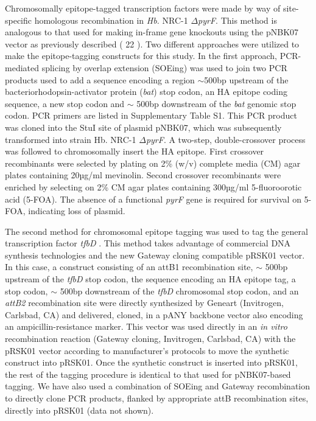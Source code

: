Chromosomally epitope-tagged transcription factors were made by way of site-specific homologous recombination in {\em Hb.} NRC-1 $\Delta${\em pyrF}. This method is analogous to that used for making in-frame gene knockouts using the pNBK07 vector as previously described ( 22 ). Two different approaches were utilized to make the epitope-tagging constructs for this study. In the first approach, PCR-mediated splicing by overlap extension (SOEing) \cite{horton1989engineering} was used to join two PCR products used to add a sequence encoding a region $\sim$500bp upstream of the bacteriorhodopsin-activator protein ({\em bat}) stop codon, an HA epitope coding sequence, a new stop codon and $\sim$ 500bp downstream of the {\em bat} genomic stop codon. PCR primers are listed in Supplementary Table S1. This PCR product was cloned into the StuI site of plasmid pNBK07, which was subsequently transformed into strain Hb. NRC-1 $\Delta${\em pyrF}. A two-step, double-crossover process was followed to chromosomally insert the HA epitope. First crossover recombinants were selected by plating on 2\% (w/v) complete media (CM) agar plates containing 20µg/ml mevinolin. Second crossover recombinants were enriched by selecting on 2\% CM agar plates containing 300µg/ml 5-fluoroorotic acid (5-FOA). The absence of a functional  {\em pyrF}  gene is required for survival on 5-FOA, indicating loss of plasmid.

The second method for chromosomal epitope tagging was used to tag the general transcription factor  {\em tfbD} . This method takes advantage of commercial DNA synthesis technologies and the new Gateway cloning compatible pRSK01 vector. In this case, a construct consisting of an attB1 recombination site, $\sim$ 500bp upstream of the  {\em tfbD}  stop codon, the sequence encoding an HA epitope tag, a stop codon, $\sim$ 500bp downstream of the  {\em tfbD}  chromosomal stop codon, and an {\em attB2} recombination site were directly synthesized by Geneart (Invitrogen, Carlsbad, CA) and delivered, cloned, in a pANY backbone vector also encoding an ampicillin-resistance marker. This vector was used directly in an {\em in vitro} recombination reaction (Gateway cloning, Invitrogen, Carlsbad, CA) with the pRSK01 vector according to manufacturer’s protocols to move the synthetic construct into pRSK01. Once the synthetic construct is inserted into pRSK01, the rest of the tagging procedure is identical to that used for pNBK07-based tagging. We have also used a combination of SOEing and Gateway recombination to directly clone PCR products, flanked by appropriate attB recombination sites, directly into pRSK01 (data not shown).

